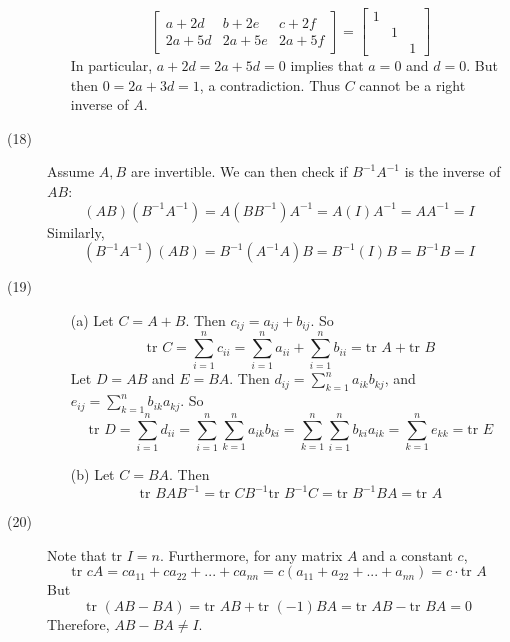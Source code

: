 \documentclass[openany]{book}
\begin{document}
\begin{description}
\begin{itemize}
$$\begin{bmatrix}
a + 2d & b + 2e & c + 2f \\
2a + 5d & 2a + 5e & 2a + 5f
\end{bmatrix} = \begin{bmatrix}
1 & & \\
& 1 & \\
& & 1
\end{bmatrix} $$
In particular, $a + 2d = 2a + 5d = 0$ implies that $a = 0$ and $d = 0$. But then $0 = 2a + 3d = 1$, a contradiction. Thus $C$ cannot be a right inverse of $A$.
\end{itemize}
\item[(18)]
Assume $A, B$ are invertible. We can then check if $B^{-1}A^{-1}$ is the inverse of $AB$:
$$(AB)(B^{-1}A^{-1}) = A(BB^{-1})A^{-1} = A(I)A^{-1} = AA^{-1} = I$$
Similarly,
$$(B^{-1}A^{-1})(AB) = B^{-1}(A^{-1}A)B = B^{-1}(I)B = B^{-1}B = I$$
\item[(19)]
\begin{itemize}
\item[(a)]
Let $C = A + B$. Then $c_{ij} = a_{ij} + b_{ij}$. So
$$\text{tr }C = \sum_{i=1}^n c_{ii} = \sum_{i=1}^n a_{ii} + \sum_{i=1}^n b_{ii} = \text{tr }A + \text{tr }B$$
Let $D = AB$ and $E = BA$. Then $d_{ij} = \sum_{k=1}^n a_{ik}b_{kj}$, and $e_{ij} = \sum_{k=1}^n b_{ik}a_{kj}$. So
$$\text{tr }D = \sum_{i = 1}^n d_{ii} = \sum_{i=1}^n\sum_{k=1}^n a_{ik}b_{ki} = \sum_{k=1}^n\sum_{i=1}^n b_{ki}a_{ik} = \sum_{k=1}^n e_{kk} = \text{tr }E$$
\item[(b)]
Let $C = BA$. Then
$$\text{tr }BAB^{-1} = \text{tr }CB^{-1} \text{tr }B^{-1}C = \text{tr }B^{-1}BA = \text{tr }A$$
\end{itemize}
\item[(20)]
Note that $\text{tr }I = n$. Furthermore, for any matrix $A$ and a constant $c$, 
$$\text{tr }cA = ca_{11} + ca_{22} + ... + ca_{nn} = c(a_{11} + a_{22} + ... + a_{nn}) = c \cdot \text{tr }A$$ 
But
$$\text{tr }(AB - BA) = \text{tr }AB + \text{tr }(-1)BA = \text{tr }AB - \text{tr }BA = 0$$
Therefore, $AB - BA \neq I$.
\end{description}
\end{document}
